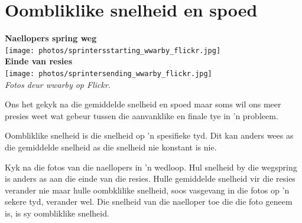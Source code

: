 \section{Oombliklike snelheid en spoed}


\begin{minipage}{.5\textwidth}
\begin{center}
\textbf{Naellopers spring weg}\\
\texttt{[image: photos/sprintersstarting\_wwarby\_flickr.jpg]}\\
\textbf{Einde van resies}\\
\texttt{[image: photos/sprintersending\_wwarby\_flickr.jpg]}\\
\textit{Fotos deur wwarby op Flickr.}
\end{center}
\end{minipage}
\begin{minipage}{.5\textwidth}

Ons het gekyk na die gemiddelde snelheid en spoed maar soms wil ons meer presies weet wat gebeur tussen die aanvanklike en finale tye in  'n probleem.

Oombliklike snelheid is die snelheid op  'n spesifieke tyd. Dit kan anders wees as die gemiddelde snelheid as die snelheid nie konstant is nie.

Kyk na die fotos van die naellopers in  'n wedloop. Hul snelheid by die wegspring is anders as aan die einde van die resies. Hulle gemiddelde snelheid vir die resies verander nie maar hulle oombklilike snelheid, soos vasgevang in die fotos op  'n sekere tyd, verander wel. Die snelheid van die naelloper toe die die foto geneem is, is sy oombliklike snelheid.

\end{minipage}

\\




